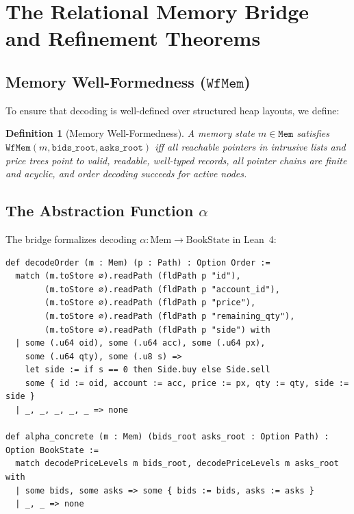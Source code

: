 \documentclass[11pt,a4paper]{article}
\newtheorem{definition}{Definition}
\begin{document}
\section{The Relational Memory Bridge and Refinement Theorems}
\label{sec:bridge}

\subsection{Memory Well-Formedness \texorpdfstring{($\mathtt{WfMem}$)}{(WfMem)}}

To ensure that decoding is well-defined over structured heap layouts, we define:
\begin{definition}[Memory Well-Formedness]
A memory state $m \in \mathtt{Mem}$ satisfies $\mathtt{WfMem}(m, \mathtt{bids\_root}, \mathtt{asks\_root})$ iff all reachable pointers in intrusive lists and price trees point to valid, readable, well-typed records, all pointer chains are finite and acyclic, and order decoding succeeds for active nodes.
\end{definition}

\subsection{The Abstraction Function \texorpdfstring{$\alpha$}{alpha}}

The bridge formalizes decoding $\alpha : \text{Mem} \to \text{BookState}$ in Lean~4:

\begin{lstlisting}[language=lean4]
def decodeOrder (m : Mem) (p : Path) : Option Order :=
  match (m.toStore ∅).readPath (fldPath p "id"),
        (m.toStore ∅).readPath (fldPath p "account_id"),
        (m.toStore ∅).readPath (fldPath p "price"),
        (m.toStore ∅).readPath (fldPath p "remaining_qty"),
        (m.toStore ∅).readPath (fldPath p "side") with
  | some (.u64 oid), some (.u64 acc), some (.u64 px),
    some (.u64 qty), some (.u8 s) =>
    let side := if s == 0 then Side.buy else Side.sell
    some { id := oid, account := acc, price := px, qty := qty, side := side }
  | _, _, _, _, _ => none

def alpha_concrete (m : Mem) (bids_root asks_root : Option Path) : Option BookState :=
  match decodePriceLevels m bids_root, decodePriceLevels m asks_root with
  | some bids, some asks => some { bids := bids, asks := asks }
  | _, _ => none
\end{lstlisting}
\end{document}
